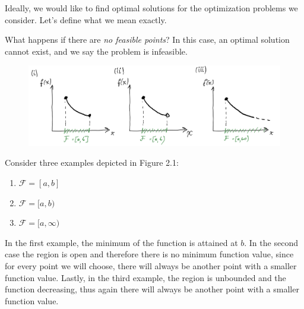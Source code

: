 
Ideally, we would like to find optimal solutions for the optimization problems we consider.  Let's define what we mean exactly.


What happens if there are \emph{no feasible points}?
In this case, an optimal solution cannot exist, and we say the problem
is infeasible.


\begin{figure}[h]
  \centering
     \includegraphics[width=\textwidth]{fig/lect1_attaining-min.png}
\caption{}
\label{fig:regions}
\end{figure}

Consider three examples depicted in Figure 2.1:

\begin{enumerate}[label=(\roman*)]
\item $\mathcal{F} = [a,b]$
\item $\mathcal{F} = [a,b)$
\item $\mathcal{F} = [a,\infty)$
\end{enumerate}

In the first example, the minimum of the function is attained at $b$.
In the second case the region is open and therefore there is
no minimum function value, since for every point we will choose,
there will always be another point with a smaller function value.
Lastly, in the third example, the region is unbounded and the function
decreasing, thus again
there will always be another point with a smaller function value.




